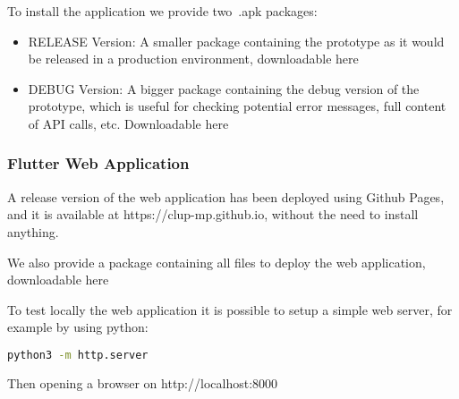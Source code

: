 To install the application we provide two~.apk packages:
\begin{itemize}
    \item RELEASE Version: A smaller package containing the prototype as it would be released in a production environment, downloadable here
    \item DEBUG Version: A bigger package containing the debug version of the prototype, which is useful for checking potential error messages, full content of API calls, etc. Downloadable here
\end{itemize}

\subsubsection{Flutter Web Application}
A release version of the web application has been deployed using Github Pages, and it is available at https://clup-mp.github.io, without the need to install anything.

We also provide a package containing all files to deploy the web application, downloadable here

To test locally the web application it is possible to setup a simple web server, for example by using python:
\begin{lstlisting}[language=bash]
    python3 -m http.server
\end{lstlisting}
Then opening a browser on http://localhost:8000


